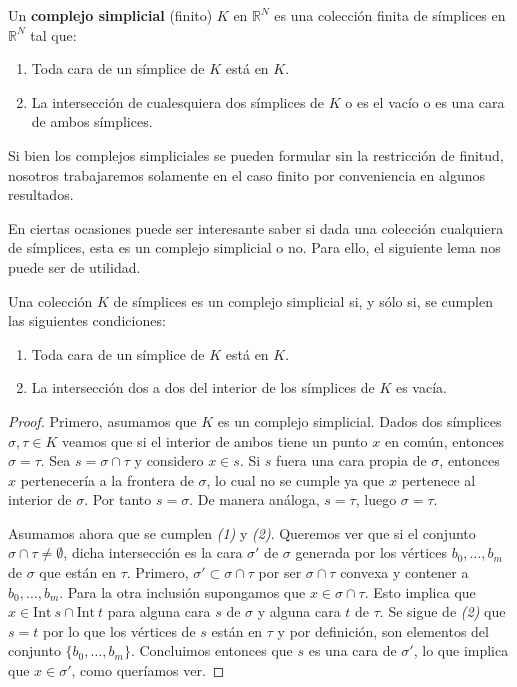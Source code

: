\begin{definicion}
	Un \textbf{complejo simplicial} (finito) \(K\) en \(\mathbb{R}^{N}\) es una
	colección finita de símplices en \(\mathbb{R}^{N}\) tal que:
	\begin{enumerate}
		\item Toda cara de un símplice de \(K\) está en \(K\).
		\item La intersección de cualesquiera dos símplices de \(K\) o es el vacío o es
			una cara de ambos símplices.
	\end{enumerate}
\end{definicion}
\begin{nota}
	Si bien los complejos simpliciales se pueden formular sin la restricción de finitud,
	nosotros trabajaremos solamente en el caso finito por conveniencia en algunos
	resultados.
\end{nota}

En ciertas ocasiones puede ser interesante saber si dada una colección
cualquiera de símplices, esta es un complejo simplicial o no. Para ello, el siguiente
lema nos puede ser de utilidad.

\begin{lema}
	Una colección \(K\) de símplices es un complejo simplicial si, y sólo si, se cumplen
	las siguientes condiciones:
	\begin{enumerate}
		\item Toda cara de un símplice de \(K\) está en \(K\).
		\item La intersección dos a dos del interior de los símplices de \(K\) es vacía.
	\end{enumerate}
\end{lema}
\begin{proof}
	Primero, asumamos que \(K\) es un complejo simplicial. Dados dos símplices \(\sigma
	, \tau \in K\) veamos que si el interior de ambos tiene un punto \(x\) en común,
	entonces \(\sigma = \tau\). Sea \(s = \sigma \cap \tau\) y considero \(x \in s\). Si
	\(s\) fuera una cara propia de \(\sigma\), entonces \(x\) pertenecería a la frontera
	de \(\sigma\), lo cual no se cumple ya que \(x\) pertenece al interior de \(\sigma\).
	Por tanto \(s = \sigma\). De manera análoga, \(s = \tau\), luego \(\sigma = \tau\).

	Asumamos ahora que se cumplen \textit{(1)} y \textit{(2)}. Queremos ver que si
	el conjunto \(\sigma \cap \tau \neq \emptyset\), dicha intersección es la cara
	\(\sigma'\) de \(\sigma\) generada por los vértices \(b_{0},\ldots,b_{m}\) de
	\(\sigma\) que están en \(\tau\). Primero, \(\sigma' \subset \sigma \cap \tau\) por
	ser \(\sigma \cap \tau\) convexa y contener a \(b_{0}, \ldots, b_{m}\). Para la otra
	inclusión supongamos que \(x \in \sigma \cap \tau\). Esto implica que
	\(x \in \text{Int}\ s \cap \text{Int}\ t\) para alguna cara \(s\) de \(\sigma\) y
	alguna cara \(t\) de \(\tau\). Se sigue de \textit{(2)} que \(s = t\) por lo que los
	vértices de \(s\) están en \(\tau\) y por definición, son elementos del conjunto \(\{
	b_{0}, \ldots, b_{m}\}\). Concluimos entonces que \(s\) es una cara de \(\sigma'\), lo
	que implica que \(x \in \sigma'\), como queríamos ver.
\end{proof}

